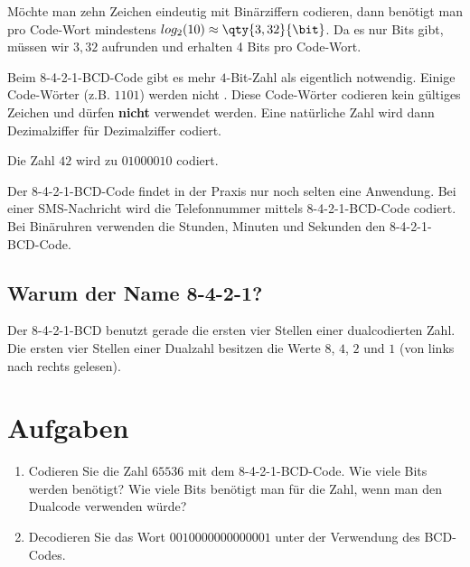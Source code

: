 \begin{hinweis}
Möchte man zehn Zeichen eindeutig mit Binärziffern codieren, dann benötigt man pro Code-Wort mindestens $log_2(10) \approx \qty{3,32}{\bit}$. Da es nur  Bits gibt, müssen wir $3,32$ aufrunden und erhalten 4 Bits pro Code-Wort.
\end{hinweis}

Beim 8-4-2-1-BCD-Code gibt es mehr $4$-Bit-Zahl als eigentlich notwendig. Einige Code-Wörter (z.B. $1101$) werden nicht . Diese Code-Wörter codieren kein gültiges Zeichen und dürfen \textbf{nicht} verwendet werden. Eine natürliche Zahl wird dann Dezimalziffer für Dezimalziffer codiert. 

\begin{example}
Die Zahl $42$ wird zu $01000010$ codiert.
\end{example}

Der 8-4-2-1-\ac{BCD}-Code findet in der Praxis nur noch selten eine Anwendung. Bei einer \ac{SMS}-Nachricht wird die Telefonnummer mittels 8-4-2-1-\ac{BCD}-Code codiert. Bei Binäruhren verwenden die Stunden, Minuten und Sekunden den 8-4-2-1-\ac{BCD}-Code.

\subsection{Warum der Name 8-4-2-1?}

Der 8-4-2-1-\ac{BCD} benutzt gerade die ersten vier Stellen einer dualcodierten Zahl. Die ersten vier Stellen einer Dualzahl besitzen die Werte $8$, $4$, $2$ und $1$ (von links nach rechts gelesen).

\section{Aufgaben}

\fillwithgrid{0.5in}

\begin{enumerate}
\item Codieren Sie die Zahl $65536$ mit dem 8-4-2-1-\ac{BCD}-Code. Wie viele Bits werden benötigt? Wie viele Bits benötigt man für die Zahl, wenn man den Dualcode verwenden würde?
\item Decodieren Sie das Wort $0010000000000001$ unter der Verwendung des \ac{BCD}-Codes.
\end{enumerate}